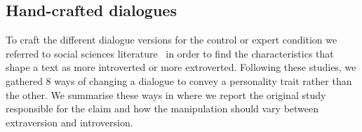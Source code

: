\documentclass[nomenclature, english, biblatex]{kththesis}
\begin{document}
\subsection{Hand-crafted dialogues}
\label{sec:hand_crafted}
To craft the different dialogue versions for the control or expert condition we referred to social sciences literature~\cite{pennebaker1999linguistic, furnham1990language, thorne1987press, heylighen2002variation, dewaele1999extraversion} in order to find the characteristics that shape a text as more introverted or more extroverted. Following these studies, we gathered 8 ways of changing a dialogue to convey a personality trait rather than the other. We summarise these ways in  where we report the original study responsible for the claim and how the manipulation should vary between extraversion and introversion.
\end{document}
